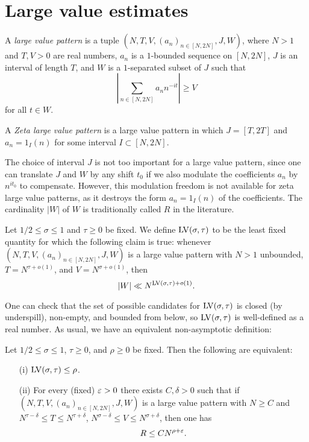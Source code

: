 \chapter{Large value estimates}

\begin{definition}\label{large-pattern-def} A \emph{large value pattern} is a tuple $(N, T, V, (a_n)_{n \in [N,2N]}, J, W)$, where $N > 1$ and $T, V > 0$ are real numbers, $a_n$ is a $1$-bounded sequence on $[N,2N]$, $J$ is an interval of length $T$, and $W$ is a $1$-separated subset of $J$ such that
\begin{equation}\label{V-large}
        \left|\sum_{n \in [N,2N]} a_n n^{-it} \right| \geq V
\end{equation}
for all $t \in W$.

A \emph{Zeta large value pattern} is a large value pattern in which $J = [T,2T]$ and $a_n = 1_I(n)$ for some interval $I \subset [N,2N]$.
\end{definition}

The choice of interval $J$ is not too important for a large value pattern, since one can translate $J$ and $W$ by any shift $t_0$ if we also modulate the coefficients $a_n$ by $n^{it_0}$ to compensate.  However, this modulation freedom is not available for zeta large value patterns, as it destroys the form $a_n = 1_I(n)$ of the coefficients.  The cardinality $|W|$ of $W$ is traditionally called $R$ in the literature.

\begin{definition}\label{lv-def} Let $1/2 \leq \sigma \leq 1$ and $\tau \geq 0$ be fixed. We define $\mathrm{LV}(\sigma,\tau)$ to be the least fixed quantity for which the following claim is true: whenever $(N,T,V,(a_n)_{n \in [N,2N]},J,W)$ is a large value pattern with $N>1$ unbounded, $T = N^{\tau+o(1)}$, and $V = N^{\sigma+o(1)}$, then
$$ |W| \ll N^{\mathrm{LV}(\sigma,\tau)+o(1)}.$$
\end{definition}


One can check that the set of possible candidates for $\mathrm{LV}(\sigma,\tau)$ is closed (by underspill), non-empty, and bounded from below, so $\mathrm{LV}(\sigma,\tau)$ is well-defined as a real number.  As usual, we have an equivalent non-asymptotic definition:

\begin{lemma}\label{lv-asymp} Let $1/2 \leq \sigma \leq 1$, $\tau \geq 0$, and $\rho \geq 0$ be fixed.  Then the following are equivalent:
    \begin{itemize}
    \item[(i)] $\mathrm{LV}(\sigma,\tau) \leq \rho$.
    \item[(ii)] For every (fixed)  $\varepsilon>0$ there exists $C, \delta>0$ such that if $(N,T,V,(a_n)_{n \in [N,2N]},J,W)$ is a large value pattern with $N \geq C$ and $N^{\tau-\delta} \leq T \leq N^{\tau+\delta}$, $N^{\sigma-\delta} \leq V \leq N^{\sigma+\delta}$, then one has
    $$ R \leq C N^{\rho+\varepsilon}.$$
    \end{itemize}
\end{lemma}

